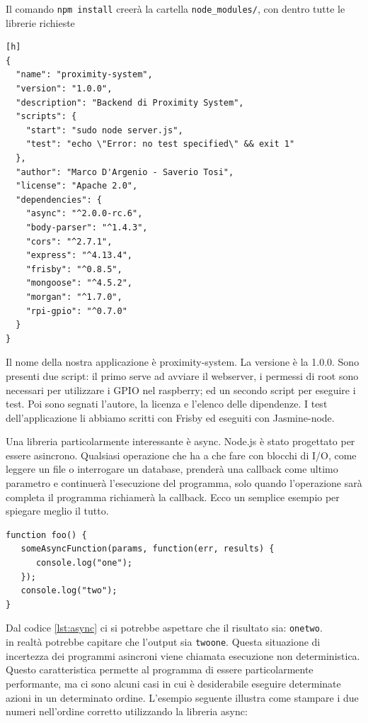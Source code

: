 Il comando \texttt{npm install} creerà la cartella \texttt{node\_modules/}, con dentro tutte le librerie richieste

\begin{lstlisting}[caption={package.json}, style=javaScriptCode][h]
{
  "name": "proximity-system",
  "version": "1.0.0",
  "description": "Backend di Proximity System",
  "scripts": {
    "start": "sudo node server.js",
    "test": "echo \"Error: no test specified\" && exit 1"
  },
  "author": "Marco D'Argenio - Saverio Tosi",
  "license": "Apache 2.0",
  "dependencies": {
    "async": "^2.0.0-rc.6",
    "body-parser": "^1.4.3",
    "cors": "^2.7.1",
    "express": "^4.13.4",
    "frisby": "^0.8.5",
    "mongoose": "^4.5.2",
    "morgan": "^1.7.0",
    "rpi-gpio": "^0.7.0"
  }
}
\end{lstlisting}

Il nome della nostra applicazione è proximity-system. 
La versione è la 1.0.0. 
Sono presenti due script: il primo serve ad avviare il webserver, i permessi di root sono necessari per utilizzare i GPIO nel raspberry; ed un secondo script per eseguire i test. 
Poi sono segnati l'autore, la licenza e l'elenco delle dipendenze. 
I test dell'applicazione li abbiamo scritti con Frisby ed eseguiti con Jasmine-node.

Una libreria particolarmente interessante è async. 
Node.js è stato progettato per essere asincrono.
Qualsiasi operazione che ha a che fare con blocchi di I/O, come leggere un file o interrogare un database, prenderà una callback come ultimo parametro e continuerà l'esecuzione del programma, 
solo quando l'operazione sarà completa il programma richiamerà la callback. 
Ecco un semplice esempio per spiegare meglio il tutto.

\begin{lstlisting}[caption={operazioni asincrone}, style=javaScriptCode, label={lst:async}]
function foo() {
   someAsyncFunction(params, function(err, results) {
      console.log("one");
   });
   console.log("two");
}
\end{lstlisting}

Dal codice \ref{lst:async} ci si potrebbe aspettare che il risultato sia:
\texttt{onetwo}.\\
in realtà potrebbe capitare che l’output sia \texttt{twoone}.
Questa situazione di incertezza dei programmi asincroni viene chiamata esecuzione non deterministica. 
Questo caratteristica permette al programma di essere particolarmente performante, ma ci sono alcuni casi in cui è desiderabile eseguire determinate azioni in un determinato ordine. 
L'esempio seguente illustra come stampare i due numeri nell'ordine corretto utilizzando la libreria async:

